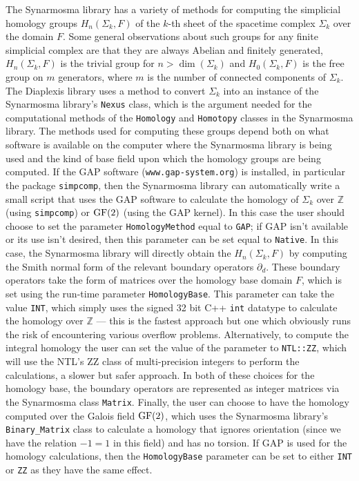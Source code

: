 \documentclass[12pt,letterpaper]{report}
\begin{document}
The Synarmosma library has a variety of methods for computing the simplicial homology groups $H_n(\Sigma_k,F)$ 
of the $k$-th sheet of the spacetime complex $\Sigma_k$ over the domain $F$. Some general observations about 
such groups for any finite simplicial complex are that they are always Abelian and finitely generated, 
$H_n(\Sigma_k,F)$ is the trivial group for $n > \dim(\Sigma_k)$ and $H_0(\Sigma_k,F)$ is the free group 
on $m$ generators, where $m$ is the number of connected components of $\Sigma_k$. The Diaplexis library 
uses a method to convert $\Sigma_k$ into an instance of the Synarmosma library's \texttt{Nexus} class, 
which is the argument needed for the computational methods of the \texttt{Homology} and \texttt{Homotopy} 
classes in the Synarmosma library. The methods used for computing these groups depend both on what software 
is available on the computer where the Synarmosma library is being used and the kind of base field upon which 
the homology groups are being computed. If the GAP software (\texttt{www.gap-system.org}) is installed, in 
particular the package \texttt{simpcomp}, then the Synarmosma library can automatically write a small script 
that uses the GAP software to calculate the homology of $\Sigma_k$ over $\mathbb{Z}$ (using \texttt{simpcomp}) 
or $\textnormal{GF}(2)$ (using the GAP kernel). In this case the user should choose to set the parameter 
\texttt{HomologyMethod} equal to \texttt{GAP}; if GAP isn't available or its use isn't desired, then this 
parameter can be set equal to \texttt{Native}. In this case, the Synarmosma library will directly obtain the 
$H_n(\Sigma_k,F)$ by computing the Smith normal form of the relevant boundary operators $\partial_d$. These 
boundary operators take the form of matrices over the homology base domain $F$, which is set using the 
run-time parameter \texttt{HomologyBase}. This parameter can take the value \texttt{INT}, which simply uses 
the signed 32 bit C++ \texttt{int} datatype to calculate the homology over $\mathbb{Z}$ --- this is the 
fastest approach but one which obviously runs the risk of encountering various overflow problems. Alternatively, 
to compute the integral homology the user can set the value of the parameter to \texttt{NTL::ZZ}, which will 
use the NTL's ZZ class of multi-precision integers to perform the calculations, a slower but safer approach. 
In both of these choices for the homology base, the boundary operators are represented as integer matrices via 
the Synarmosma class \texttt{Matrix}. Finally, the user can choose to have the homology computed over the Galois 
field $\textnormal{GF}(2)$, which uses the Synarmosma library's \texttt{Binary\_Matrix} class to calculate a 
homology that ignores orientation (since we have the relation $-1 =1$ in this field) and has no torsion. If GAP 
is used for the homology calculations, then the \texttt{HomologyBase} parameter can be set to either \texttt{INT} 
or \texttt{ZZ} as they have the same effect.  
\end{document}
